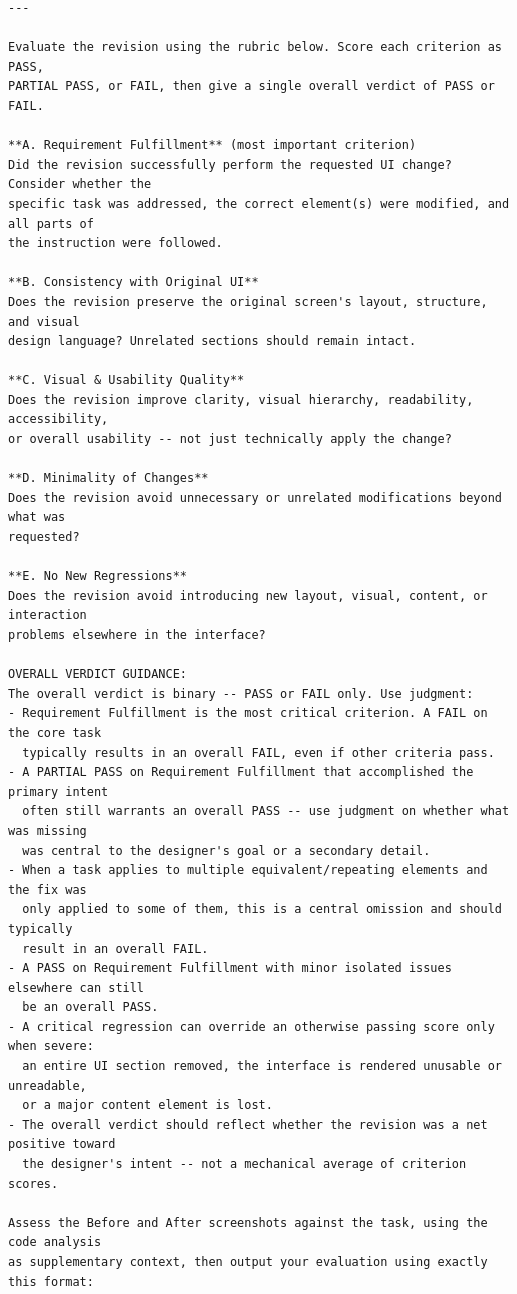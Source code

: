 \documentclass[sigconf,nonacm]{acmart}
\begin{document}
\begin{mdframed}[style=promptbox]
\begin{lstlisting}[basicstyle=\scriptsize\ttfamily, breaklines=true, breakatwhitespace=true,
                   xleftmargin=0pt, xrightmargin=0pt]
---

Evaluate the revision using the rubric below. Score each criterion as PASS,
PARTIAL PASS, or FAIL, then give a single overall verdict of PASS or FAIL.

**A. Requirement Fulfillment** (most important criterion)
Did the revision successfully perform the requested UI change? Consider whether the
specific task was addressed, the correct element(s) were modified, and all parts of
the instruction were followed.

**B. Consistency with Original UI**
Does the revision preserve the original screen's layout, structure, and visual
design language? Unrelated sections should remain intact.

**C. Visual & Usability Quality**
Does the revision improve clarity, visual hierarchy, readability, accessibility,
or overall usability -- not just technically apply the change?

**D. Minimality of Changes**
Does the revision avoid unnecessary or unrelated modifications beyond what was
requested?

**E. No New Regressions**
Does the revision avoid introducing new layout, visual, content, or interaction
problems elsewhere in the interface?

OVERALL VERDICT GUIDANCE:
The overall verdict is binary -- PASS or FAIL only. Use judgment:
- Requirement Fulfillment is the most critical criterion. A FAIL on the core task
  typically results in an overall FAIL, even if other criteria pass.
- A PARTIAL PASS on Requirement Fulfillment that accomplished the primary intent
  often still warrants an overall PASS -- use judgment on whether what was missing
  was central to the designer's goal or a secondary detail.
- When a task applies to multiple equivalent/repeating elements and the fix was
  only applied to some of them, this is a central omission and should typically
  result in an overall FAIL.
- A PASS on Requirement Fulfillment with minor isolated issues elsewhere can still
  be an overall PASS.
- A critical regression can override an otherwise passing score only when severe:
  an entire UI section removed, the interface is rendered unusable or unreadable,
  or a major content element is lost.
- The overall verdict should reflect whether the revision was a net positive toward
  the designer's intent -- not a mechanical average of criterion scores.

Assess the Before and After screenshots against the task, using the code analysis
as supplementary context, then output your evaluation using exactly this format:


\end{lstlisting}
\end{mdframed}
\end{document}
